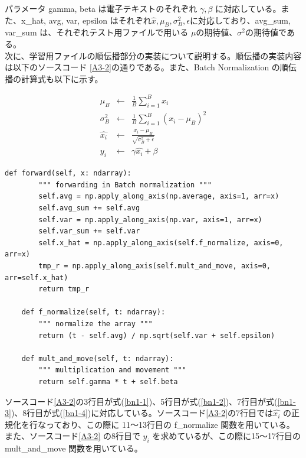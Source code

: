 \documentclass[a4paper,dvipdfmx]{jsarticle}
\begin{document}
パラメータ gamma, beta は電子テキストのそれぞれ $\gamma, \beta$ に対応している。また、x\_hat, avg, var, epsilon はそれぞれ$\hat{x}, \mu_B, \sigma_B^2, \epsilon$に対応しており、avg\_sum, var\_sum は、それぞれテスト用ファイルで用いる $\mu$の期待値、$\sigma^2$の期待値である。\\

次に、学習用ファイルの順伝播部分の実装について説明する。順伝播の実装内容は以下のソースコード \ref{A3-2}の通りである。また、Batch Normalization の順伝播の計算式も以下に示す。

\begin{eqnarray}
\label{bn1-1}
	\mu_B & \leftarrow & \frac{1}{B} \sum_{i=1}^{B}{x_i} \\
\label{bn1-2}
	\sigma_B^2 & \leftarrow & \frac{1}{B} \sum_{i=1}^{B}{(x_i - \mu_B)^2} \\
\label{bn1-3}
	\hat{x_i} & \leftarrow &  \frac{x_i - \mu_B}{\sqrt{\sigma_B^2 + \epsilon}}\\
\label{bn1-4}
	y_i & \leftarrow & \gamma \hat{x_i} + \beta 
\end{eqnarray}


\begin{lstlisting}[caption="Batch Normalization (学習用: 順伝播)",label=A3-2]
    def forward(self, x: ndarray):
        """ forwarding in Batch normalization """
        self.avg = np.apply_along_axis(np.average, axis=1, arr=x)
        self.avg_sum += self.avg
        self.var = np.apply_along_axis(np.var, axis=1, arr=x)
        self.var_sum += self.var
        self.x_hat = np.apply_along_axis(self.f_normalize, axis=0, arr=x)
        tmp_r = np.apply_along_axis(self.mult_and_move, axis=0, arr=self.x_hat)
        return tmp_r

    def f_normalize(self, t: ndarray):
        """ normalize the array """
        return (t - self.avg) / np.sqrt(self.var + self.epsilon)

    def mult_and_move(self, t: ndarray):
        """ multiplication and movement """
        return self.gamma * t + self.beta
\end{lstlisting}

ソースコード\ref{A3-2}の3行目が式(\ref{bn1-1})、5行目が式(\ref{bn1-2})、7行目が式(\ref{bn1-3})、8行目が式(\ref{bn1-4})に対応している。ソースコード\ref{A3-2}の7行目では$\hat{x_i}$ の正規化を行なっており、この際に 11〜13行目の f\_normalize 関数を用いている。また、ソースコード\ref{A3-2} の8行目で $y_i$ を求めているが、この際に15〜17行目の mult\_and\_move 関数を用いている。\\
\end{document}

